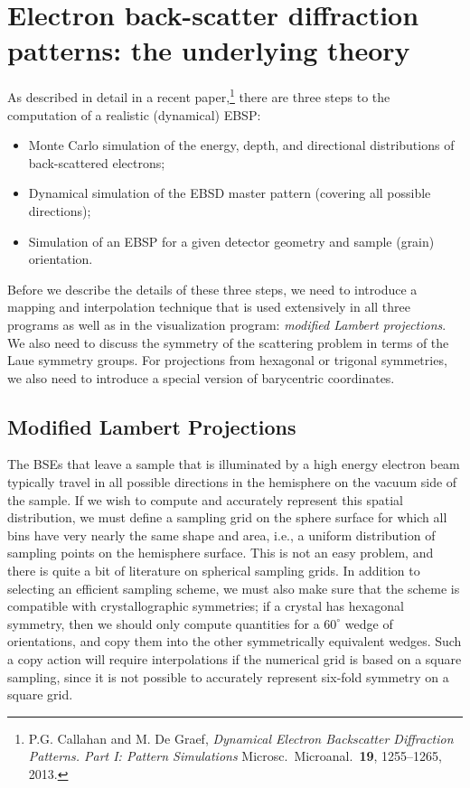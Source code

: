 \documentclass[DIV=calc, paper=letter, fontsize=11pt]{scrartcl}	 %
\begin{document}
\section{Electron back-scatter diffraction patterns: the underlying theory\label{sec:theory}}
As described in detail in a recent paper,\footnote{P.G. Callahan and M. De Graef, \textit{Dynamical Electron Backscatter Diffraction Patterns. Part I: Pattern Simulations}
Microsc.\ Microanal.\ \textbf{19}, 1255--1265, 2013.} there are three steps to the computation of a realistic (dynamical) EBSP:
\begin{itemize}
	\item Monte Carlo simulation of the energy, depth, and directional distributions of back-scattered electrons;
	\item Dynamical simulation of the EBSD master pattern (covering all possible directions);
	\item Simulation of an EBSP for a given detector geometry and sample (grain) orientation.
\end{itemize}

Before we describe the details of these three steps, we need to introduce a mapping and interpolation technique that is used extensively in all
three programs as well as in the visualization program: \textit{modified Lambert projections}.  We also need to discuss the 
symmetry of the scattering problem in terms of the Laue symmetry groups. For projections from hexagonal or trigonal symmetries, we 
also need to introduce a special version of barycentric coordinates.

\subsection{Modified Lambert Projections \label{sec:Lambert}}
The BSEs that leave a sample that is illuminated by a high energy electron beam typically travel in all possible directions in the hemisphere
on the vacuum side of the sample.  If we wish to compute and accurately represent this spatial distribution, we must define a sampling grid 
on the sphere surface for which all bins have very nearly the same shape and area, i.e., a uniform distribution of sampling points 
on the hemisphere surface.  This is not an easy problem, and there is quite a bit of literature on spherical sampling grids.  In addition 
to selecting an efficient sampling scheme, we must also make sure that the scheme is compatible with crystallographic symmetries; if a crystal
has hexagonal symmetry, then we should only compute quantities for a $60^{\circ}$ wedge of orientations, and copy them into the other symmetrically
equivalent wedges.  Such a copy action will require interpolations if the numerical grid is based on a square sampling, since it is not possible
to accurately represent six-fold symmetry on a square grid.  
\end{document}
